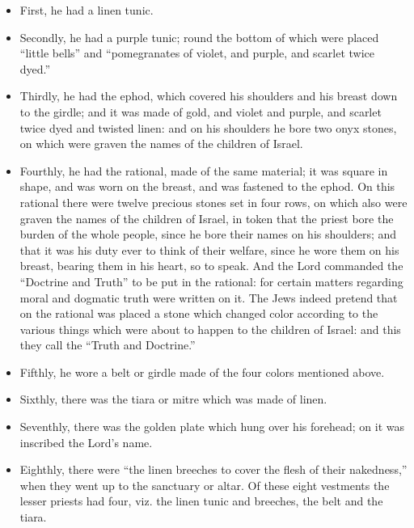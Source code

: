 \begin{itemize}

\item First, he had a linen tunic. 
\item Secondly, he had a purple tunic; round the bottom of which were placed ``little bells'' and ``pomegranates of violet, and purple, and scarlet twice dyed.'' 
\item Thirdly, he had the ephod, which covered his shoulders and his breast down to the girdle; and it was made of gold, and violet and purple, and scarlet twice dyed and twisted linen: and on his shoulders he bore two onyx stones, on which were graven the names of the children of Israel. 
\item Fourthly, he had the rational, made of the same material; it was square in shape, and was worn on the breast, and was fastened to the ephod. On this rational there were twelve precious stones set in four rows, on which also were graven the names of the children of Israel, in token that the priest bore the burden of the whole people, since he bore their names on his shoulders; and that it was his duty ever to think of their welfare, since he wore them on his breast, bearing them in his heart, so to speak. And the Lord commanded the ``Doctrine and Truth'' to be put in the rational: for certain matters regarding moral and dogmatic truth were written on it. The Jews indeed pretend that on the rational was placed a stone which changed color according to the various things which were about to happen to the children of Israel: and this they call the ``Truth and Doctrine.'' 
\item Fifthly, he wore a belt or girdle made of the four colors mentioned above. 
\item Sixthly, there was the tiara or mitre which was made of linen. 
\item Seventhly, there was the golden plate which hung over his forehead; on it was inscribed the Lord's name. 
\item Eighthly, there were ``the linen breeches to cover the flesh of their nakedness,'' when they went up to the sanctuary or altar. Of these eight vestments the lesser priests had four, viz. the linen tunic and breeches, the belt and the tiara. 
\end{itemize}

